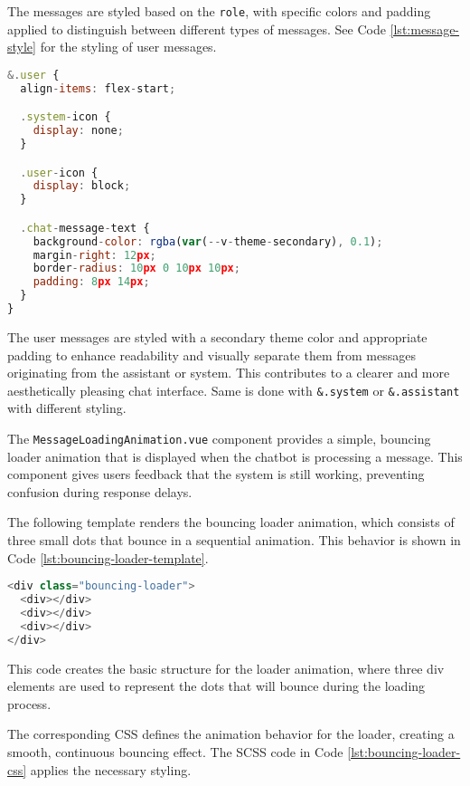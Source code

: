 The messages are styled based on the \texttt{role}, with specific colors and padding applied to distinguish between
different types of messages. See Code \ref{lst:message-style} for the styling of user messages.

\begin{lstlisting}[language=JavaScript, caption={Message Style Based on Role (\texttt{ChatMessage.vue})},
firstnumber=50,label={lst:message-style}]
&.user {
  align-items: flex-start;

  .system-icon {
    display: none;
  }

  .user-icon {
    display: block;
  }

  .chat-message-text {
    background-color: rgba(var(--v-theme-secondary), 0.1);
    margin-right: 12px;
    border-radius: 10px 0 10px 10px;
    padding: 8px 14px;
  }
}
\end{lstlisting}

The user messages are styled with a secondary theme color and appropriate padding to enhance readability and visually
separate them from messages originating from the assistant or system. This contributes to a clearer and more
aesthetically pleasing chat interface. Same is done with \texttt{&.system} or \texttt{&.assistant} with different
styling.

The \texttt{MessageLoadingAnimation.vue} component provides a simple, bouncing loader animation that is displayed
when the chatbot is processing a message. This component gives users feedback that the system is still working,
preventing confusion during response delays.

The following template renders the bouncing loader animation, which consists of three small dots that bounce in
a sequential animation. This behavior is shown in Code \ref{lst:bouncing-loader-template}.

\begin{lstlisting}[language=JavaScript, caption={Bouncing Loader Template (\texttt{MessageLoadingAnimation.vue})},
firstnumber=4,label={lst:bouncing-loader-template}]
<div class="bouncing-loader">
  <div></div>
  <div></div>
  <div></div>
</div>
\end{lstlisting}

This code creates the basic structure for the loader animation, where three div
elements are used to represent the dots that will bounce during the loading process.

The corresponding \ac{CSS} defines the animation behavior for the loader, creating a smooth, continuous bouncing effect.
The \ac{SCSS} code in Code \ref{lst:bouncing-loader-css} applies the necessary styling.

